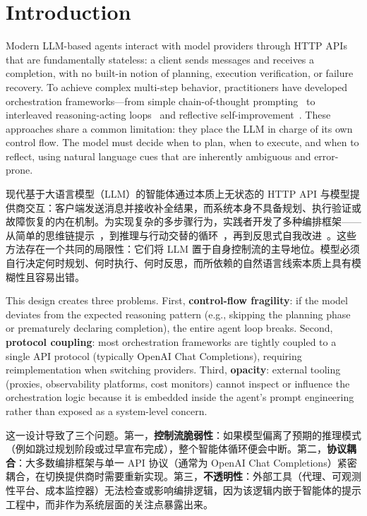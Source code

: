 \section{Introduction}
\label{sec:intro}

Modern LLM-based agents interact with model providers through HTTP APIs that are fundamentally stateless: a client sends messages and receives a completion, with no built-in notion of planning, execution verification, or failure recovery. To achieve complex multi-step behavior, practitioners have developed orchestration frameworks---from simple chain-of-thought prompting~\citep{wei2022cot} to interleaved reasoning-acting loops~\citep{yao2022react} and reflective self-improvement~\citep{shinn2023reflexion,madaan2023selfrefine}. These approaches share a common limitation: they place the LLM in charge of its own control flow. The model must decide when to plan, when to execute, and when to reflect, using natural language cues that are inherently ambiguous and error-prone.
\begin{chinese}
现代基于大语言模型（LLM）的智能体通过本质上无状态的 HTTP API 与模型提供商交互：客户端发送消息并接收补全结果，而系统本身不具备规划、执行验证或故障恢复的内在机制。为实现复杂的多步骤行为，实践者开发了多种编排框架——从简单的思维链提示~\citep{wei2022cot}，到推理与行动交替的循环~\citep{yao2022react}，再到反思式自我改进~\citep{shinn2023reflexion,madaan2023selfrefine}。这些方法存在一个共同的局限性：它们将 LLM 置于自身控制流的主导地位。模型必须自行决定何时规划、何时执行、何时反思，而所依赖的自然语言线索本质上具有模糊性且容易出错。
\end{chinese}

This design creates three problems. First, \textbf{control-flow fragility}: if the model deviates from the expected reasoning pattern (e.g., skipping the planning phase or prematurely declaring completion), the entire agent loop breaks. Second, \textbf{protocol coupling}: most orchestration frameworks are tightly coupled to a single API protocol (typically OpenAI Chat Completions), requiring reimplementation when switching providers. Third, \textbf{opacity}: external tooling (proxies, observability platforms, cost monitors) cannot inspect or influence the orchestration logic because it is embedded inside the agent's prompt engineering rather than exposed as a system-level concern.
\begin{chinese}
这一设计导致了三个问题。第一，\textbf{控制流脆弱性}：如果模型偏离了预期的推理模式（例如跳过规划阶段或过早宣布完成），整个智能体循环便会中断。第二，\textbf{协议耦合}：大多数编排框架与单一 API 协议（通常为 OpenAI Chat Completions）紧密耦合，在切换提供商时需要重新实现。第三，\textbf{不透明性}：外部工具（代理、可观测性平台、成本监控器）无法检查或影响编排逻辑，因为该逻辑内嵌于智能体的提示工程中，而非作为系统层面的关注点暴露出来。
\end{chinese}

